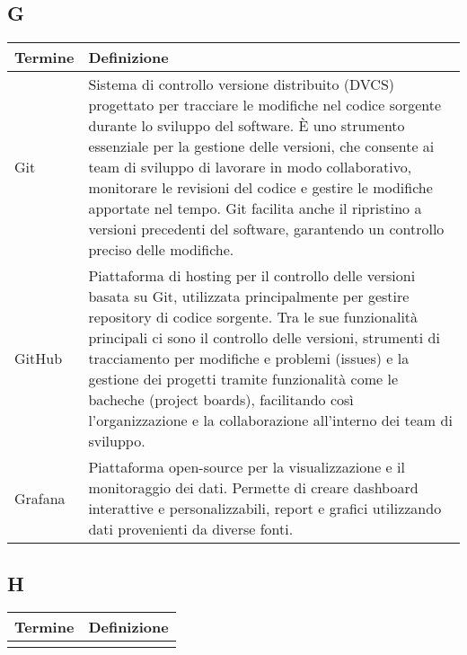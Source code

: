 \documentclass[10pt]{article}
\begin{document}
\subsection{G} %
\begin{longtable}{|>{\centering\arraybackslash}m{2.5cm}|>{\arraybackslash}m{12.5cm}|}
\hline
\rowcolor[gray]{0.8}
\textbf{Termine} & \textbf{Definizione}\\
\endhead
\hline
Git & Sistema di controllo versione distribuito (DVCS) progettato per tracciare le modifiche nel codice sorgente durante lo sviluppo del software. È uno strumento essenziale per la gestione delle versioni, che consente ai team di sviluppo di lavorare in modo collaborativo, monitorare le revisioni del codice e gestire le modifiche apportate nel tempo. Git facilita anche il ripristino a versioni precedenti del software, garantendo un controllo preciso delle modifiche.\\
\hline
GitHub & Piattaforma di hosting per il controllo delle versioni basata su Git, utilizzata principalmente per gestire repository di codice sorgente. Tra le sue funzionalità principali ci sono il controllo delle versioni, strumenti di tracciamento per modifiche e problemi (issues) e la gestione dei progetti tramite funzionalità come le bacheche (project boards), facilitando così l’organizzazione e la collaborazione all’interno dei team di sviluppo.\\
\hline
Grafana & Piattaforma open-source per la visualizzazione e il monitoraggio dei dati. Permette di creare dashboard interattive e personalizzabili, report e grafici utilizzando dati provenienti da diverse fonti.\\
\hline
\end{longtable}

\subsection{H} %
\begin{longtable}{|>{\centering\arraybackslash}m{2.5cm}|>{\arraybackslash}m{12.5cm}|}
\hline
\rowcolor[gray]{0.8}
\textbf{Termine} & \textbf{Definizione}\\
\endhead
\hline
 & \\
\hline
\end{longtable}

\newpage %
\end{document}
